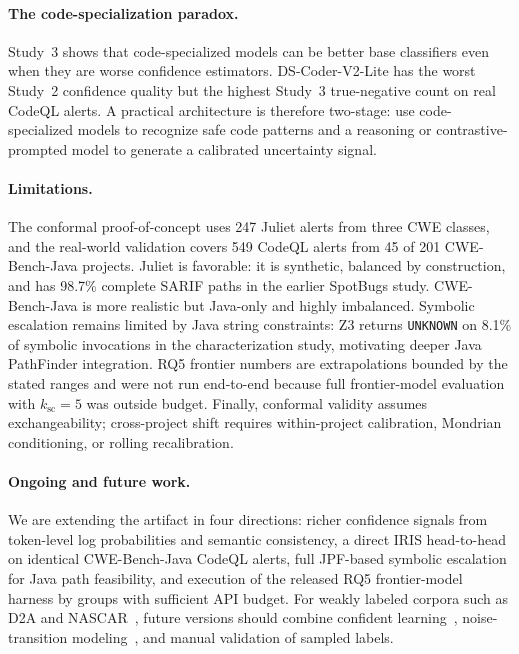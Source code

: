 \paragraph{The code-specialization paradox.}
Study~3 shows that code-specialized models can be better base classifiers even when they are worse confidence estimators. DS-Coder-V2-Lite has the worst Study~2 confidence quality but the highest Study~3 true-negative count on real CodeQL alerts. A practical architecture is therefore two-stage: use code-specialized models to recognize safe code patterns and a reasoning or contrastive-prompted model to generate a calibrated uncertainty signal.

\paragraph{Limitations.}
The conformal proof-of-concept uses 247 Juliet alerts from three CWE classes, and the real-world validation covers 549 CodeQL alerts from 45 of 201 CWE-Bench-Java projects. Juliet is favorable: it is synthetic, balanced by construction, and has 98.7\% complete SARIF paths in the earlier SpotBugs study. CWE-Bench-Java is more realistic but Java-only and highly imbalanced. Symbolic escalation remains limited by Java string constraints: Z3 returns \texttt{UNKNOWN} on 8.1\% of symbolic invocations in the characterization study, motivating deeper Java PathFinder integration. RQ5 frontier numbers are extrapolations bounded by the stated ranges and were not run end-to-end because full frontier-model evaluation with $k_{\mathrm{sc}}=5$ was outside budget. Finally, conformal validity assumes exchangeability; cross-project shift requires within-project calibration, Mondrian conditioning, or rolling recalibration.

\paragraph{Ongoing and future work.}
We are extending the artifact in four directions: richer confidence signals from token-level log probabilities and semantic consistency, a direct IRIS head-to-head on identical CWE-Bench-Java CodeQL alerts, full JPF-based symbolic escalation for Java path feasibility, and execution of the released RQ5 frontier-model harness by groups with sufficient API budget. For weakly labeled corpora such as D2A and NASCAR~\cite{d2a2020,nascar2022}, future versions should combine confident learning~\cite{northcutt2021}, noise-transition modeling~\cite{goldberger2017}, and manual validation of sampled labels.
